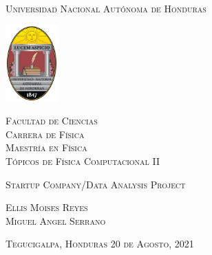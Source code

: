 \documentclass[12pt,a4paper,openright]{article}
\begin{document}

\begin{center}
\vspace{-0.5cm}
{\Large\textsc{Universidad Nacional Autónoma de Honduras}}
\vspace{0.5cm}

\begin{center}
  \includegraphics[width=2cm]{unah}
\end{center}
\vspace{1cm}

{\large
\textsc{Facultad de Ciencias}\\
\textsc{Carrera de Física}\\
\vspace{0.45cm}
\textsc{Maestría en Física}\\
\vspace{0.75cm}
\textsc{T\'opicos de F\'isica Computacional II}\\
}

\normalsize\textsc{Startup Company/Data Analysis Project }
\vspace{1.15cm}

{\large\textsc{Ellis Moises Reyes\\Miguel Angel Serrano}}
\vspace{5cm}




{\large\textsc{Tegucigalpa, Honduras 20 de Agosto, 2021}}

\end{center}


\newpage

\end{document}
